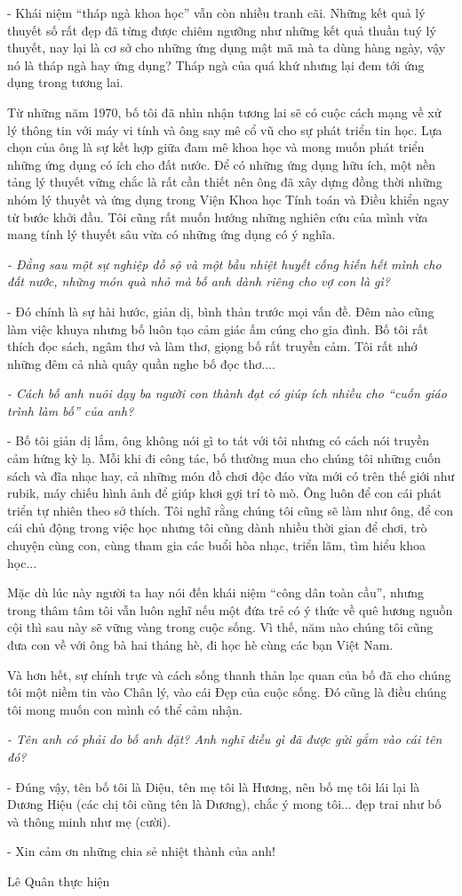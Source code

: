 - Khái niệm “tháp ngà khoa học” vẫn còn nhiều tranh cãi. Những kết quả lý thuyết số rất đẹp đã từng được chiêm ngưỡng như những kết quả thuần tuý lý thuyết, nay lại là cơ sở cho những ứng dụng mật mã mà ta dùng hàng ngày, vậy nó là tháp ngà hay ứng dụng? Tháp ngà của quá khứ nhưng lại đem tới ứng dụng trong tương lai.

Từ những năm 1970, bố tôi đã nhìn nhận tương lai sẽ có cuộc cách mạng về xử lý thông tin với máy vi tính và ông say mê cổ vũ cho sự phát triển tin học. Lựa chọn của ông là sự kết hợp giữa đam mê khoa học và mong muốn phát triển những ứng dụng có ích cho đất nước. Để có những ứng dụng hữu ích, một nền tảng lý thuyết vững chắc là rất cần thiết nên ông đã xây dựng đồng thời những nhóm lý thuyết và ứng dụng trong Viện Khoa học Tính toán và Điều khiển ngay từ bước khởi đầu.  
Tôi cũng rất muốn hướng những nghiên cứu của mình vừa mang tính lý thuyết sâu vừa có những ứng dụng có ý nghĩa.

\textit{- Đằng sau một sự nghiệp đồ sộ và một bầu nhiệt huyết cống hiến hết mình cho đất nước, những món quà nhỏ mà bố anh dành riêng cho vợ con là gì?}

- Đó chính là sự hài hước, giản dị, bình thản trước mọi vấn đề. Đêm nào cũng làm việc khuya nhưng bố luôn tạo cảm giác ấm cúng cho gia đình. Bố tôi rất thích đọc sách, ngâm thơ và làm thơ, giọng bố rất truyền cảm. Tôi rất nhớ những đêm cả nhà quây quần nghe bố đọc thơ....

\textit{- Cách bố anh nuôi dạy ba người con thành đạt có giúp ích nhiều cho “cuốn giáo trình làm bố” của anh? }

- Bố tôi giản dị lắm, ông không nói gì to tát với tôi nhưng có cách nói truyền cảm hứng kỳ lạ. Mỗi khi đi công tác, bố thường mua cho chúng tôi những cuốn sách và đĩa nhạc hay, cả những món đồ chơi độc đáo vừa mới có trên thế giới như rubik, máy chiếu hình ảnh để giúp khơi gợi trí tò mò. Ông luôn để con cái phát triển tự nhiên theo sở thích. Tôi nghĩ rằng chúng tôi cũng sẽ làm như ông, để con cái chủ động trong việc học nhưng tôi cũng dành nhiều thời gian để chơi, trò chuyện cùng con, cùng tham gia các buổi hòa nhạc, triển lãm, tìm hiểu khoa học...

Mặc dù lúc này người ta hay nói đến khái niệm “công dân toàn cầu”, nhưng trong thâm tâm tôi vẫn luôn nghĩ nếu một đứa trẻ có ý thức về quê hương nguồn cội thì sau này sẽ vững vàng trong cuộc sống. Vì thế, năm nào chúng tôi cũng đưa con về với ông bà hai tháng hè, đi học hè cùng các bạn Việt Nam.

Và hơn hết, sự chính trực và cách sống thanh thản lạc quan của bố đã cho chúng tôi một niềm tin vào Chân lý, vào cái Đẹp của cuộc sống. Đó cũng là điều chúng tôi mong muốn con mình có thể cảm nhận.

\textit{- Tên anh có phải do bố anh đặt? Anh nghĩ điều gì đã được gửi gắm vào cái tên đó?}

- Đúng vậy, tên bố tôi là Diệu, tên mẹ tôi là Hương, nên bố mẹ tôi lái lại là Dương Hiệu (các chị tôi cũng tên là Dương), chắc ý mong tôi... đẹp trai như bố và thông minh như mẹ (cười). 

- Xin cảm ơn những chia sẻ nhiệt thành của anh!

Lê Quân thực hiện